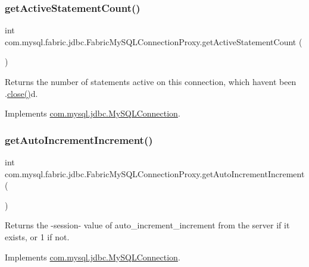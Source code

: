 \subsubsection{\texorpdfstring{get\+Active\+Statement\+Count()}{getActiveStatementCount()}}
{\footnotesize\ttfamily int com.\+mysql.\+fabric.\+jdbc.\+Fabric\+My\+S\+Q\+L\+Connection\+Proxy.\+get\+Active\+Statement\+Count (\begin{DoxyParamCaption}{ }\end{DoxyParamCaption})}

Returns the number of statements active on this connection, which haven\textquotesingle{}t been .\mbox{\hyperlink{classcom_1_1mysql_1_1fabric_1_1jdbc_1_1_fabric_my_s_q_l_connection_proxy_a061c926e5ae98b3b992ee1a83a44847d}{close()}}d. 

Implements \mbox{\hyperlink{interfacecom_1_1mysql_1_1jdbc_1_1_my_s_q_l_connection_aa42802b4debbacd9680e2ca0b70fd53d}{com.\+mysql.\+jdbc.\+My\+S\+Q\+L\+Connection}}.

\mbox{\label{classcom_1_1mysql_1_1fabric_1_1jdbc_1_1_fabric_my_s_q_l_connection_proxy_ac369523a903e1f8fb0c590a87cf2430c}} 
\subsubsection{\texorpdfstring{get\+Auto\+Increment\+Increment()}{getAutoIncrementIncrement()}}
{\footnotesize\ttfamily int com.\+mysql.\+fabric.\+jdbc.\+Fabric\+My\+S\+Q\+L\+Connection\+Proxy.\+get\+Auto\+Increment\+Increment (\begin{DoxyParamCaption}{ }\end{DoxyParamCaption})}

Returns the -\/session-\/ value of \textquotesingle{}auto\+\_\+increment\+\_\+increment\textquotesingle{} from the server if it exists, or \textquotesingle{}1\textquotesingle{} if not. 

Implements \mbox{\hyperlink{interfacecom_1_1mysql_1_1jdbc_1_1_my_s_q_l_connection_acb6ababcad41a91c6a44d300d09acff9}{com.\+mysql.\+jdbc.\+My\+S\+Q\+L\+Connection}}.

